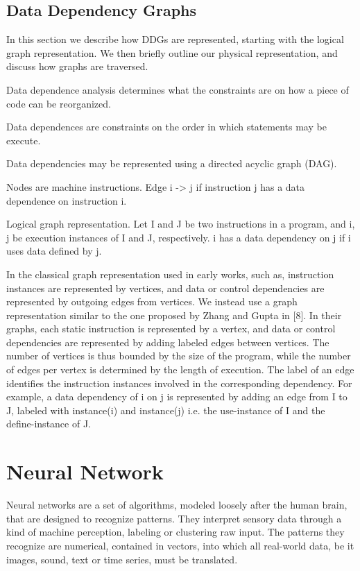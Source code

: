 \subsection{Data Dependency Graphs}
In this section we describe how DDGs are represented, starting with the logical graph representation. We then briefly outline our physical representation, and discuss how
graphs are traversed.

Data dependence analysis determines what the constraints are on how a piece of code can be reorganized.

Data dependences are constraints on the order in which statements may be execute.

Data dependencies may be represented using a directed acyclic graph (DAG).

Nodes are machine instructions. Edge i -> j if instruction j has a data dependence on instruction i.

Logical graph representation. Let I and J be two instructions in a program, and i, j be execution instances of I and J, respectively. i has a data dependency on j if i
uses data defined by j.

In the classical graph representation used in early works, such as, instruction instances are represented by vertices, and data or control dependencies are represented by outgoing
edges from vertices. We instead use a graph representation similar to the one proposed by Zhang
and Gupta in [8]. In their graphs, each static instruction is represented by a vertex, and data or control dependencies are represented by adding labeled edges between vertices.
The number of vertices is thus bounded by the size of the program, while the number of edges per vertex is determined by the length of execution. The label of an edge identifies the instruction instances involved in the corresponding dependency. For example, a data dependency of i on j is represented by adding an edge from I to J, labeled with instance(i) and instance(j)
i.e. the use-instance of I and the define-instance of J.


\section{Neural Network}
Neural networks are a set of algorithms, modeled loosely after the human brain, that are designed to recognize patterns. They interpret sensory data through a kind of machine perception, labeling or clustering raw input. The patterns they recognize are numerical, contained in vectors, into which all real-world data, be it images, sound, text or time series, must be translated.

